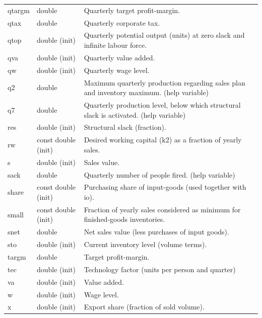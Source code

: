 \documentclass{article}
\begin{document}
\begin{longtable}{p{}p{}p{}}
qtargm & double & Quarterly target profit-margin.\\
qtax & double & Quarterly corporate tax.\\
qtop & double (init) & Quarterly potential output (units) at zero slack and infinite labour force.\\
qva & double (init) & Quarterly value added.\\
qw & double (init) & Quarterly wage level.\\
q2 & double & Maximum quarterly production regarding sales plan and inventory maximum. (help variable)\\
q7 & double & Quarterly production level, below which structural slack is activated. (help variable)\\
res & double (init) & Structural slack (fraction).\\
rw & const double (init) & Desired working capital (k2) as a fraction of yearly sales.\\
s & double (init) & Sales value.\\
sack & double & Quarterly number of people fired. (help variable)\\
share & const double (init) & Purchasing share of input-goods (used together with io).\\
small & const double (init) & Fraction of yearly sales considered as minimum for finished-goods inventories.\\
snet & double & Net sales value (less purchases of input goods).\\
sto & double (init) & Current inventory level (volume terms).\\
targm & double & Target profit-margin.\\
tec & double (init) & Technology factor (units per person and quarter)\\
va & double (init) & Value added.\\
w & double (init) & Wage level.\\
x & double (init) & Export share (fraction of sold volume).\\
\midrule


\end{longtable}
\end{document}
